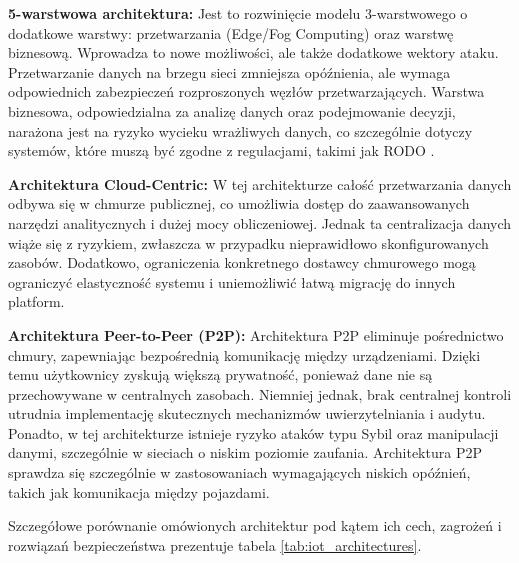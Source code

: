 \textbf{5-warstwowa architektura:}
Jest to rozwinięcie modelu 3-warstwowego o dodatkowe warstwy: przetwarzania (Edge/Fog Computing) oraz warstwę biznesową. Wprowadza to nowe możliwości, ale także dodatkowe wektory ataku. Przetwarzanie danych na brzegu sieci zmniejsza opóźnienia, ale wymaga odpowiednich zabezpieczeń rozproszonych węzłów przetwarzających. Warstwa biznesowa, odpowiedzialna za analizę danych oraz podejmowanie decyzji, narażona jest na ryzyko wycieku wrażliwych danych, co szczególnie dotyczy systemów, które muszą być zgodne z regulacjami, takimi jak RODO \cite{rao2023iot}.

\textbf{Architektura Cloud-Centric:}
W tej architekturze całość przetwarzania danych odbywa się w chmurze publicznej, co umożliwia dostęp do zaawansowanych narzędzi analitycznych i dużej mocy obliczeniowej. Jednak ta centralizacja danych wiąże się z ryzykiem, zwłaszcza w przypadku nieprawidłowo skonfigurowanych zasobów. Dodatkowo, ograniczenia konkretnego dostawcy chmurowego mogą ograniczyć elastyczność systemu i uniemożliwić łatwą migrację do innych platform.

\textbf{Architektura Peer-to-Peer (P2P):}
Architektura P2P eliminuje pośrednictwo chmury, zapewniając bezpośrednią komunikację między urządzeniami. Dzięki temu użytkownicy zyskują większą prywatność, ponieważ dane nie są przechowywane w centralnych zasobach. Niemniej jednak, brak centralnej kontroli utrudnia implementację skutecznych mechanizmów uwierzytelniania i audytu. Ponadto, w tej architekturze istnieje ryzyko ataków typu Sybil oraz manipulacji danymi, szczególnie w sieciach o niskim poziomie zaufania. Architektura P2P sprawdza się szczególnie w zastosowaniach wymagających niskich opóźnień, takich jak komunikacja między pojazdami.

Szczegółowe porównanie omówionych architektur pod kątem ich cech, zagrożeń i rozwiązań bezpieczeństwa prezentuje tabela \ref{tab:iot_architectures}.

